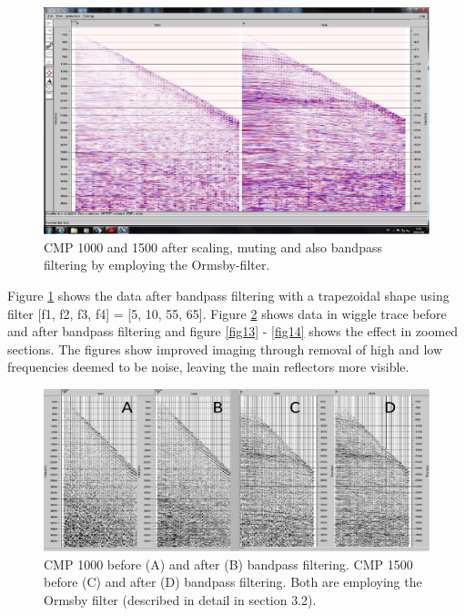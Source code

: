 \documentclass[10pt,a4paper]{article}
\begin{document}
\begin{figure}[H]
\includegraphics[width=\textwidth, trim={0.6cm 1cm 0.1cm 0.7cm},clip]{fig11.jpg}
\caption{CMP 1000 and 1500 after scaling, muting and also bandpass filtering by employing the Ormsby-filter.}
\label{fig11}
\end{figure}

\noindent Figure \ref{fig11} shows the data after bandpass filtering with a trapezoidal shape using filter [f1, f2, f3, f4] = [5, 10, 55, 65]. Figure \ref{fig12} shows data in wiggle trace before and after bandpass filtering and figure \ref{fig13} - \ref{fig14} shows the effect in zoomed sections. The figures show improved imaging through removal of high and low frequencies deemed to be noise, leaving the main reflectors more visible.

\begin{figure}[H]
\includegraphics[width=\textwidth]{fig12.jpg}
\caption{CMP 1000 before (A) and after (B) bandpass filtering. CMP 1500 before (C) and after (D) bandpass filtering. Both are employing the Ormsby filter (described in detail in section 3.2).}
\label{fig12}
\end{figure}
\end{document}
